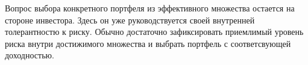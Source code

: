 Вопрос выбора конкретного портфеля из эффективного множества остается на стороне инвестора. Здесь он уже руководствуется
своей внутренней толерантностю к риску. Обычно достаточно зафиксировать приемлимый уровень риска внутри достижимого множества
и выбрать портфель с соответсвующей доходностью. 





